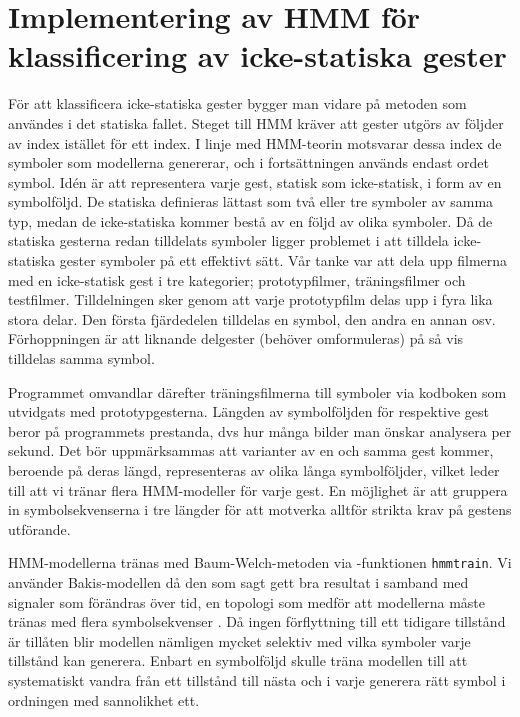 \documentclass[../rapport_MVEX01-11-05]{subfiles}
\begin{document}
\section{Implementering av HMM för klassificering av icke-statiska gester}
För att klassificera icke-statiska gester bygger man vidare på metoden som användes i det 
statiska fallet. Steget till HMM kräver att gester utgörs av följder av index istället
för ett index. I linje med HMM-teorin motsvarar dessa index de symboler som modellerna genererar, 
och i fortsättningen används endast ordet symbol. Idén är att representera varje gest, statisk som icke-statisk, i form av 
en symbolföljd. De statiska definieras lättast som två eller tre symboler av samma typ, medan 
de icke-statiska kommer bestå av en följd av olika symboler. Då de statiska gesterna redan tilldelats
symboler ligger problemet i att tilldela icke-statiska gester symboler på ett effektivt sätt. Vår tanke
var att dela upp filmerna med en icke-statisk gest i tre kategorier; prototypfilmer, träningsfilmer och 
testfilmer. Tilldelningen sker genom att varje prototypfilm delas upp i fyra lika stora delar. Den 
första fjärdedelen tilldelas en symbol, den andra en annan osv. Förhoppningen är att liknande 
delgester (behöver omformuleras) på så vis tilldelas samma symbol. 

Programmet omvandlar därefter träningsfilmerna till symboler via kodboken som utvidgats 
med prototypgesterna. Längden av 
symbolföljden för respektive gest beror på programmets prestanda, dvs hur många bilder 
man önskar analysera per sekund. Det bör uppmärksammas att varianter av en och samma gest 
kommer, beroende på deras längd, representeras av olika långa symbolföljder, vilket leder till 
att vi tränar flera HMM-modeller för varje gest. En möjlighet är att gruppera in symbolsekvenserna 
i tre längder för att motverka alltför strikta krav på gestens utförande. 

HMM-modellerna tränas med Baum-Welch-metoden via \MATLAB-funktionen \texttt{hmmtrain}. Vi använder Bakis-modellen 
då den som sagt gett bra resultat i samband med signaler som förändras över tid, en topologi som medför att
modellerna måste tränas med flera symbolsekvenser \cite{Rabiner89}. Då ingen förflyttning till ett tidigare
tillstånd är tillåten blir modellen nämligen mycket selektiv med vilka symboler varje tillstånd kan generera. 
Enbart en symbolföljd skulle träna modellen till att systematiskt vandra från ett tillstånd till nästa och i 
varje generera rätt symbol i ordningen med sannolikhet ett. 
\end{document}
